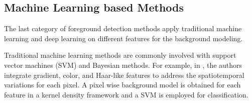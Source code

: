 \documentclass[journal]{IEEEtran}
\begin{document}

%
%
%
%
%
\subsection{Machine Learning based Methods}
The last category of foreground detection methods apply traditional machine learning and deep learning on different features for the background modeling.

%
Traditional machine learning methods are commonly involved with support vector machines (SVM) and Bayesian methods\cite{Zhang2014Statis}. For example, in \cite{Han2012}, the authors integrate gradient, color, and Haar-like features to address the spatiotemporal variations for each pixel. A pixel wise background model is obtained for each feature in a kernel density framework and a SVM is employed for classification.
\end{document}
